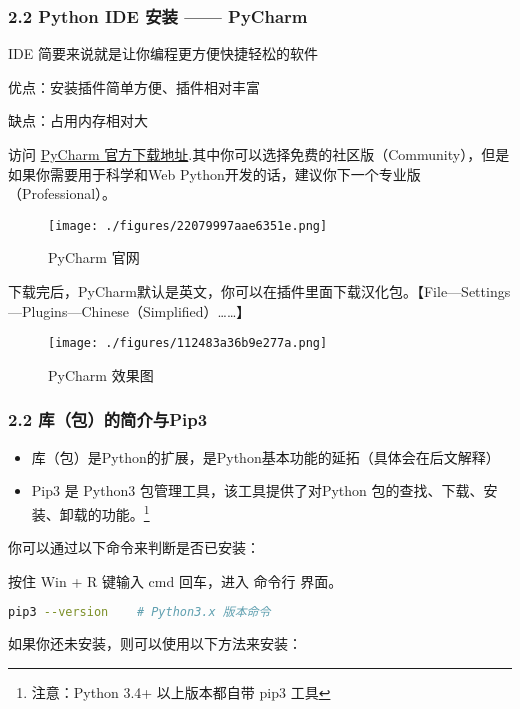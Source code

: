 \subsubsection{2.2 Python IDE 安装 —— PyCharm}

IDE 简要来说就是让你编程更方便快捷轻松的软件

优点：安装插件简单方便、插件相对丰富

缺点：占用内存相对大

访问 \href{http://www.jetbrains.com/pycharm/download/}{PyCharm 官方下载地址}.其中你可以选择免费的社区版（Community），但是如果你需要用于科学和Web Python开发的话，建议你下一个专业版（Professional）。



\begin{figure}[ht]
\centering
\texttt{[image: ./figures/22079997aae6351e.png]}
\caption{PyCharm 官网} \label{fig_PyIDE_1}
\end{figure}

下载完后，PyCharm默认是英文，你可以在插件里面下载汉化包。【File—Settings—Plugins—Chinese（Simplified）……】

\begin{figure}[ht]
\centering
\texttt{[image: ./figures/112483a36b9e277a.png]}
\caption{PyCharm 效果图} \label{fig_PyIDE_2}
\end{figure}

\subsubsection{2.2 库（包）的简介与Pip3}

\begin{itemize}
\item 库（包）是Python的扩展，是Python基本功能的延拓（具体会在后文解释）
\item Pip3 是 Python3 包管理工具，该工具提供了对Python 包的查找、下载、安装、卸载的功能。\footnote{注意：Python 3.4+ 以上版本都自带 pip3 工具}
\end{itemize}

你可以通过以下命令来判断是否已安装：

按住 Win + R 键输入 cmd 回车，进入 命令行 界面。


\begin{lstlisting}[language=bash]
pip3 --version    # Python3.x 版本命令
\end{lstlisting}

如果你还未安装，则可以使用以下方法来安装：

